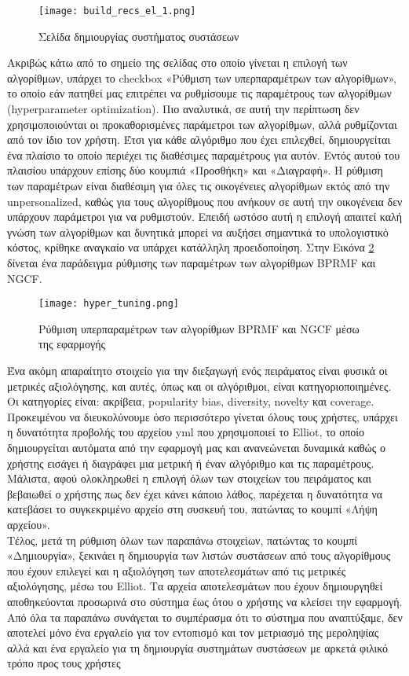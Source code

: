 \begin{figure}[!htb]
	\centering
	\texttt{[image: build\_recs\_el\_1.png]}
	\caption{Σελίδα δημιουργίας συστήματος συστάσεων}
	\label{fig:build2}
\end{figure}
Ακριβώς κάτω από το σημείο της σελίδας στο οποίο γίνεται η επιλογή των αλγορίθμων, υπάρχει το checkbox «Ρύθμιση των υπερπαραμέτρων των αλγορίθμων», το οποίο εάν πατηθεί μας επιτρέπει να ρυθμίσουμε τις παραμέτρους των αλγορίθμων (hyperparameter optimization). Πιο αναλυτικά, σε αυτή την περίπτωση δεν χρησιμοποιούνται οι προκαθορισμένες παράμετροι των αλγορίθμων, αλλά ρυθμίζονται από τον ίδιο τον χρήστη. Έτσι για κάθε αλγόριθμο που έχει επιλεχθεί, δημιουργείται ένα πλαίσιο το οποίο περιέχει τις διαθέσιμες παραμέτρους για αυτόν. Εντός αυτού του πλαισίου υπάρχουν επίσης δύο κουμπιά «Προσθήκη» και «Διαγραφή». Η ρύθμιση των παραμέτρων είναι διαθέσιμη για όλες τις οικογένειες αλγορίθμων εκτός από την unpersonalized, καθώς για τους αλγορίθμους που ανήκουν σε αυτή την οικογένεια δεν υπάρχουν παράμετροι για να ρυθμιστούν. Επειδή ωστόσο αυτή η επιλογή απαιτεί καλή γνώση των αλγορίθμων και δυνητικά μπορεί να αυξήσει σημαντικά το υπολογιστικό κόστος, κρίθηκε αναγκαίο να υπάρχει κατάλληλη προειδοποίηση. Στην Εικόνα \ref{fig:build3} δίνεται ένα παράδειγμα ρύθμισης των παραμέτρων των αλγορίθμων BPRMF και NGCF.\\
\begin{figure}[!htb]
	\centering
	\texttt{[image: hyper\_tuning.png]}
	\caption{Ρύθμιση υπερπαραμέτρων των αλγορίθμων BPRMF και NGCF μέσω της εφαρμογής}
	\label{fig:build3}
\end{figure}
Ένα ακόμη απαραίτητο στοιχείο για την διεξαγωγή ενός πειράματος είναι φυσικά οι μετρικές αξιολόγησης, και αυτές, όπως και οι αλγόριθμοι, είναι κατηγοριοποιημένες. Οι κατηγορίες είναι: ακρίβεια, popularity bias, diversity, novelty και coverage.
Προκειμένου να διευκολύνουμε όσο περισσότερο γίνεται όλους τους χρήστες, υπάρχει η δυνατότητα προβολής του αρχείου yml που χρησιμοποιεί το Elliot, το οποίο δημιουργείται αυτόματα από την εφαρμογή μας και ανανεώνεται δυναμικά καθώς ο χρήστης εισάγει ή διαγράφει μια μετρική ή έναν αλγόριθμο και τις παραμέτρους. Μάλιστα, αφού ολοκληρωθεί η επιλογή όλων των στοιχείων του πειράματος και βεβαιωθεί ο χρήστης πως δεν έχει κάνει κάποιο λάθος, παρέχεται η δυνατότητα να κατεβάσει το συγκεκριμένο αρχείο στη συσκευή του, πατώντας το κουμπί «Λήψη αρχείου».\\ Τέλος, μετά τη ρύθμιση όλων των παραπάνω στοιχείων, πατώντας το κουμπί «Δημιουργία», ξεκινάει η δημιουργία των λιστών συστάσεων από τους αλγορίθμους που έχουν επιλεγεί και η αξιολόγηση των αποτελεσμάτων από τις μετρικές αξιολόγησης, μέσω του Elliot.
Τα αρχεία αποτελεσμάτων που έχουν δημιουργηθεί αποθηκεύονται προσωρινά στο σύστημα έως ότου ο χρήστης να κλείσει την εφαρμογή.\\
Από όλα τα παραπάνω συνάγεται το συμπέρασμα ότι το σύστημα που αναπτύξαμε, δεν αποτελεί μόνο ένα εργαλείο για τον εντοπισμό και τον μετριασμό της μεροληψίας αλλά και ένα εργαλείο για τη δημιουργία συστημάτων συστάσεων με αρκετά φιλικό τρόπο προς τους χρήστες
\newpage
